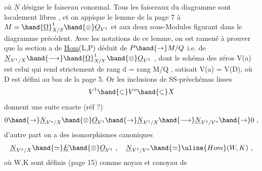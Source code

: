 où $\underline{N}$ désigne le faisceau conormal. Tous les faisceaux du diagramme sont
localement libres , et on appique le lemme de la page 7 à $M=\hand{\underline{\Omega}}^1_{X/S}\hand{\otimes}\underline{O}_{V^1}$
et aux deux sous-Modules figurant dans le diagramme précédent. Avec
les notations de ce lemme, on est ramené à prouver que la section a
 de \uline{Hom}(L,P) déduit de  $P\hand{\rightarrow} M/Q$ i.e. de  $\underline{N}_{V^1/X}\hand{\longrightarrow}\hand{\underline{\Omega}}^1_{X/Y}\hand{\otimes}\underline{O}_{V^1}$ ,
dont le schéma des zéros V(a) est celui qui rend \hand{$\mu$} strictement de rang
\hand{$<$} d = rang M/Q , satisait V(a) = V(D), où D est défini au bas de la
page 5. Or les inclusions de SS-préschémas lisses
\[ V^1 \hand{\subset} V^o \hand{\subset} X \]
donnent une suite exacte (réf ?)
\[ 0 \hand{\rightarrow} \underline{N}_{V^o/X}\hand{\otimes}\underline{O}_{V^1} \hand{\rightarrow} \underline{N}_{V^1/X} \hand{\longrightarrow} \underline{N}_{V^1/V^o} \hand{\rightarrow} 0 \ , \]
d'autre part on a des isomorphismes canoniques
\[ \underline{N}_{V^o/X} \hand{\simeq} \underline{E}\hand{\otimes}\underline{O}_{V^1} \ , \quad \underline{N}_{V^1/V^o} \hand{\simeq} \uline{Hom}(W,K) \ , \]
où W,K sont définis (page 15) comme noyau et conoyau de

